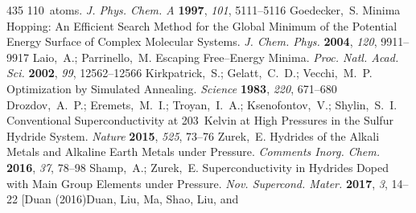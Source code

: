 \documentclass[12pt,letterpaper,oneside]{article}
\begin{document}
\begin{mcitethebibliography}{435}
  110~atoms. \emph{J. Phys. Chem. A} \textbf{1997}, \emph{101},
  5111--5116\relax
\mciteBstWouldAddEndPuncttrue
\mciteSetBstMidEndSepPunct{\mcitedefaultmidpunct}
{\mcitedefaultendpunct}{\mcitedefaultseppunct}\relax
\EndOfBibitem
{}
Goedecker,~S. Minima Hopping: An Efficient Search Method for the Global Minimum
  of the Potential Energy Surface of Complex Molecular Systems. \emph{J. Chem.
  Phys.} \textbf{2004}, \emph{120}, 9911--9917\relax
\mciteBstWouldAddEndPuncttrue
\mciteSetBstMidEndSepPunct{\mcitedefaultmidpunct}
{\mcitedefaultendpunct}{\mcitedefaultseppunct}\relax
\EndOfBibitem
{}
Laio,~A.; Parrinello,~M. Escaping Free--Energy Minima. \emph{Proc. Natl. Acad.
  Sci.} \textbf{2002}, \emph{99}, 12562--12566\relax
\mciteBstWouldAddEndPuncttrue
\mciteSetBstMidEndSepPunct{\mcitedefaultmidpunct}
{\mcitedefaultendpunct}{\mcitedefaultseppunct}\relax
\EndOfBibitem
{}
Kirkpatrick,~S.; Gelatt,~C.~D.; Vecchi,~M.~P. Optimization by Simulated
  Annealing. \emph{Science} \textbf{1983}, \emph{220}, 671--680\relax
\mciteBstWouldAddEndPuncttrue
\mciteSetBstMidEndSepPunct{\mcitedefaultmidpunct}
{\mcitedefaultendpunct}{\mcitedefaultseppunct}\relax
\EndOfBibitem
{}
Drozdov,~A.~P.; Eremets,~M.~I.; Troyan,~I.~A.; Ksenofontov,~V.; Shylin,~S.~I.
  Conventional Superconductivity at 203~Kelvin at High Pressures in the Sulfur
  Hydride System. \emph{Nature} \textbf{2015}, \emph{525}, 73--76\relax
\mciteBstWouldAddEndPuncttrue
\mciteSetBstMidEndSepPunct{\mcitedefaultmidpunct}
{\mcitedefaultendpunct}{\mcitedefaultseppunct}\relax
\EndOfBibitem
{}
Zurek,~E. Hydrides of the Alkali Metals and Alkaline Earth Metals under
  Pressure. \emph{Comments Inorg. Chem.} \textbf{2016}, \emph{37}, 78--98\relax
\mciteBstWouldAddEndPuncttrue
\mciteSetBstMidEndSepPunct{\mcitedefaultmidpunct}
{\mcitedefaultendpunct}{\mcitedefaultseppunct}\relax
\EndOfBibitem
{}
Shamp,~A.; Zurek,~E. Superconductivity in Hydrides Doped with Main Group
  Elements under Pressure. \emph{Nov. Supercond. Mater.} \textbf{2017},
  \emph{3}, 14--22\relax
\mciteBstWouldAddEndPuncttrue
\mciteSetBstMidEndSepPunct{\mcitedefaultmidpunct}
{\mcitedefaultendpunct}{\mcitedefaultseppunct}\relax
\EndOfBibitem
\bibitem[Duan (2016)Duan, Liu, Ma, Shao, Liu, and

\end{mcitethebibliography}
\end{document}
